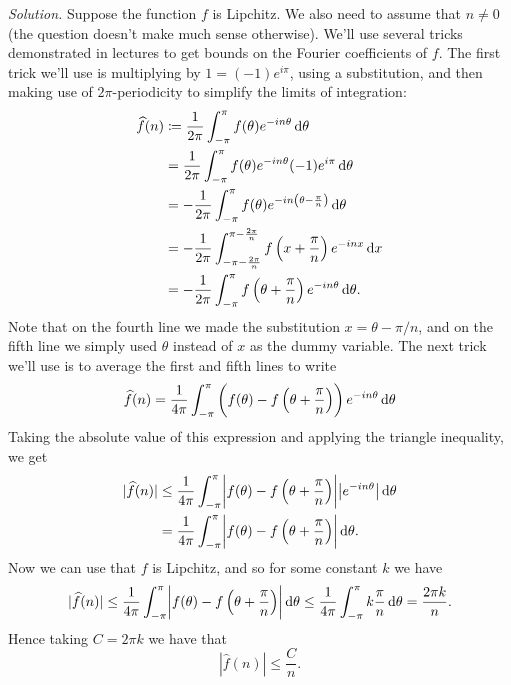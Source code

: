 \documentclass{article}
\begin{document}
\textit{Solution.}
Suppose the function $f$ is Lipchitz. We also need to assume that $n
\neq 0$ (the question doesn't make much sense otherwise). We'll use
several tricks demonstrated in lectures to get bounds on the Fourier
coefficients of $f$. The first trick we'll use is multiplying by $1 =
(-1) e^{i \pi}$, using a substitution, and then making use of
$2\pi$-periodicity to simplify the limits of integration:
%
\begin{align*}
    \widehat{f}(n)
        &\coloneqq \frac{1}{2 \pi} \int_{-\pi}^\pi f(\theta) e^{-i n \theta} \dif \theta \\
        &= \frac{1}{2 \pi} \int_{-\pi}^\pi f(\theta) e^{-i n \theta} (-1) e^{i \pi} \dif \theta \\
        &= - \frac{1}{2 \pi} \int_{-\pi}^\pi f(\theta) e^{-i n \del{\theta - \frac{\pi}{n}}} \dif \theta \\
        &= - \frac{1}{2 \pi} \int_{-\pi - \frac{2 \pi}{n}}^{\pi - \frac{2 \pi}{n}} f\del[2]{x + \frac{\pi}{n}} e^{-i n x} \dif x \\
        &= - \frac{1}{2 \pi} \int_{-\pi}^{\pi} f\del[2]{\theta + \frac{\pi}{n}} e^{-i n \theta} \dif \theta
        .
\end{align*}
%
Note that on the fourth line we made the substitution
$x = \theta - \pi / n$, and on the fifth line we simply used $\theta$
instead of $x$ as the dummy variable. The next trick we'll use is to
average the first and fifth lines to write
%
\begin{equation*}
    \widehat{f}(n) = \frac{1}{4 \pi} \int_{-\pi}^{\pi}
        \del{f(\theta) - f\del[2]{\theta + \frac{\pi}{n}}}
        e^{-i n \theta}
        \dif \theta
\end{equation*}
%
Taking the absolute value of this expression and applying the triangle
inequality, we get
%
\begin{align*}
    |\widehat{f}(n)|
        &\leq \frac{1}{4 \pi} \int_{-\pi}^{\pi}
        \envert[3]{f(\theta) - f\del[2]{\theta + \frac{\pi}{n}}}
        \envert[1]{e^{-i n \theta}}
        \dif \theta
        \\
        &= \frac{1}{4 \pi} \int_{-\pi}^{\pi}
        \envert[3]{f(\theta) - f\del[2]{\theta + \frac{\pi}{n}}}
        \dif \theta
    .
\end{align*}
%
Now we can use that $f$ is Lipchitz, and so for some constant $k$ we have
%
\begin{equation*}
    |\widehat{f}(n)|
        \leq \frac{1}{4 \pi} \int_{-\pi}^{\pi}
        \envert[3]{f(\theta) - f\del[2]{\theta + \frac{\pi}{n}}}
        \dif \theta
        \leq \frac{1}{4 \pi} \int_{-\pi}^{\pi}
        k \frac{\pi}{n}
        \dif \theta
        = \frac{2 \pi k}{n}
    .
\end{equation*}
%
Hence taking $C = 2 \pi k$ we have that
%
\begin{equation*}
    |\widehat{f}(n)| \leq \frac{C}{n}
    .
\end{equation*}
\end{document}
